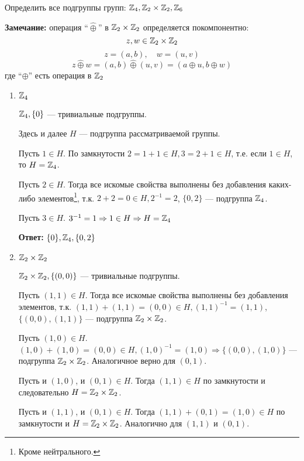 \begin{exercise}
    Определить все подгруппы групп: \(\mathbb{Z}_4, \mathbb{Z}_2 \times \mathbb{Z}_2, \mathbb{Z}_6\)

    \textbf{Замечание:} операция ``\(\hat{\oplus}\)'' в \(\mathbb{Z}_2 \times \mathbb{Z}_2\) определяется покомпонентно:
    \[z, w \in \mathbb{Z}_2 \times \mathbb{Z}_2\]
    \[z = (a, b), \quad w = (u, v)\]
    \[z \hat{\oplus} w = (a, b) \hat{\oplus} (u, v) = (a \oplus u, b \oplus w)\]
    где ``\(\oplus\)'' есть операция в \(\mathbb{Z}_2\)
\end{exercise}
\begin{solution}\itemfix
    \begin{enumerate}
        \item \(\mathbb{Z}_4\)

              \(\mathbb{Z}_4, \{0\}\) --- тривиальные подгруппы.

              Здесь и далее \(H\) --- подгруппа рассматриваемой группы.

              Пусть \(1 \in H\). По замкнутости \(2 = 1 + 1 \in H, 3 = 2 + 1 \in H\), т.е. если \(1 \in H\), то \(H = \mathbb{Z}_4\).

              Пусть \(2 \in H\). Тогда все искомые свойства выполнены без добавления каких-либо элементов\footnote{Кроме нейтрального.}, т.к. \(2 + 2 = 0 \in H, 2^{-1} = 2\), \(\{0, 2\}\) --- подгруппа \(\mathbb{Z}_4\).

              Пусть \(3 \in H\). \(3^{-1} = 1 \Rightarrow 1 \in H \Rightarrow H = \mathbb{Z}_4\)

              \textbf{Ответ:} \(\{0\}, \mathbb{Z}_4, \{0, 2\}\)

        \item \(\mathbb{Z}_2 \times \mathbb{Z}_2\)

              \(\mathbb{Z}_2 \times \mathbb{Z}_2, \{(0, 0)\}\) --- тривиальные подгруппы.

              Пусть \((1, 1) \in H\). Тогда все искомые свойства выполнены без добавления элементов, т.к. \((1, 1) + (1, 1) = (0, 0) \in H, (1, 1)^{-1} = (1, 1)\), \(\{(0, 0), (1, 1)\}\) --- подгруппа \(\mathbb{Z}_2 \times \mathbb{Z}_2\).

              Пусть \((1, 0) \in H\). \((1, 0) + (1, 0) = (0, 0) \in H, (1, 0)^{-1} = (1, 0) \Rightarrow \{(0, 0), (1, 0)\}\) --- подгруппа \(\mathbb{Z}_2 \times \mathbb{Z}_2\). Аналогичное верно для \((0, 1)\).

              Пусть и \((1, 0)\), и \((0, 1) \in H\). Тогда \((1, 1) \in H\) по замкнутости и следовательно \(H = \mathbb{Z}_2 \times \mathbb{Z}_2\).

              Пусть и \((1, 1)\), и \((0, 1) \in H\). Тогда \((1, 1) + (0, 1) = (1, 0) \in H\) по замкнутости и \(H = \mathbb{Z}_2 \times \mathbb{Z}_2\). Аналогично для \((1, 1)\) и \((0, 1)\).


\end{enumerate}
\end{solution}
